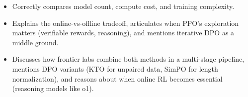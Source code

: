\begin{interviewq}

\goodgreat
\begin{itemize}
    \item {} Correctly compares model count, compute cost, and training complexity.
    \item {} Explains the online-vs-offline tradeoff, articulates when PPO's exploration matters (verifiable rewards, reasoning), and mentions iterative DPO as a middle ground.
    \item {} Discusses how frontier labs combine both methods in a multi-stage pipeline, mentions DPO variants (KTO for unpaired data, SimPO for length normalization), and reasons about when online RL becomes essential (reasoning models like o1).
\end{itemize}

\end{interviewq}


